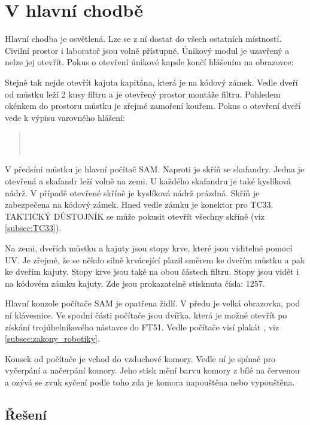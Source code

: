 \documentclass[11pt,oneside,a4paper]{article}
\begin{document}
\section{\texorpdfstring{V hlavní chodbě}{V hlavni chodbe}}
\label{sec:v_hlavni_chodbe}
Hlavní chodba je osvětlená. Lze se z ní dostat do všech ostatních místností. Civilní prostor i laboratoř jsou volně přístupné. Únikový modul je uzavřený a nelze jej otevřít. Pokus o otevření únikové kapsle končí hlášením na obrazovce: 
\begin{quote}
\end{quote}
Stejně tak nejde otevřít kajuta kapitána, která je na kódový zámek. Vedle dveří od můstku leží 2 kusy filtru a je otevřený prostor montáže filtru. Pohledem okénkem do prostoru můstku je zřejmé zamoření kouřem. Pokus o otevření dveří vede k výpisu varovného hlášení:
\begin{quote}
 \\
 \\
\end{quote}
V předsíni můstku je hlavní počítač SAM. Naproti je skříň se skafandry. Jedna je otevřená a skafandr leží volně na zemi. U každého skafandru je také kyslíková nádrž. V případě otevřené skříně je kyslíková nádrž prázdná. Skříň je zabezpečena na kódový zámek. Hned vedle zámku je konektor pro TC33. TAKTICKÝ DŮSTOJNÍK se může pokusit otevřít všechny skříně (viz \ref{subsec:TC33}).

Na zemi, dveřích můstku a kajuty jsou stopy krve, které jsou viditelné pomocí UV. Je zřejmé, že se někdo silně krvácející plazil směrem ke dveřím můstku a pak ke dveřím kajuty. Stopy krve jsou také na obou částech filtru. Stopy jsou vidět i na kódovém zámku kajuty. Zde jsou prokazatelně stisknuta čísla: 1257.

Hlavní konzole počítače SAM je opatřena židlí. V předu je velká obrazovka, pod ní klávesnice. Ve spodní části počítače jsou dvířka, která je možné otevřít po získání trojúhelníkového nástavce do FT51. Vedle počítače visí plakát , viz \ref{subsec:zakony_robotiky}.

Kousek od počítače je vchod do vzduchové komory. Vedle ní je spínač pro vyčerpání a načerpání komory. Jeho stisk mění barvu komory z bílé na červenou a ozývá se zvuk syčení podle toho zda je komora napouštěna nebo vypouštěna.

\subsection{\texorpdfstring{Řešení}{Reseni}}
\end{document}
